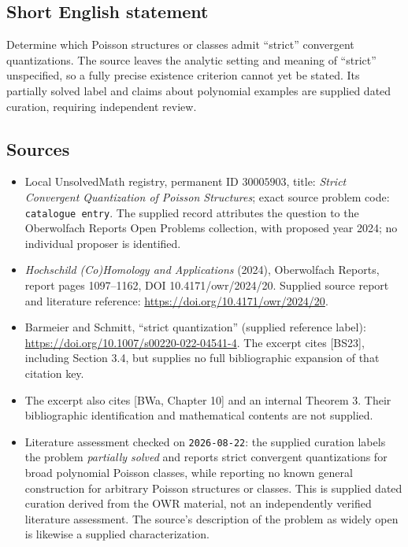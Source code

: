 \documentclass[11pt]{article}
\begin{document}
\subsection{Short English statement}
Determine which Poisson structures or classes admit ``strict'' convergent quantizations. The source leaves the analytic setting and meaning of ``strict'' unspecified, so a fully precise existence criterion cannot yet be stated. Its partially solved label and claims about polynomial examples are supplied dated curation, requiring independent review.
\subsection{Sources}
\begin{itemize}
\item Local UnsolvedMath registry, permanent ID \(30005903\), title: \emph{Strict Convergent Quantization of Poisson Structures}; exact source problem code: \texttt{catalogue entry}. The supplied record attributes the question to the Oberwolfach Reports Open Problems collection, with proposed year 2024; no individual proposer is identified.
\item \emph{Hochschild (Co)Homology and Applications} (2024), Oberwolfach Reports, report pages 1097--1162, DOI 10.4171/owr/2024/20. Supplied source report and literature reference: \url{https://doi.org/10.4171/owr/2024/20}.
\item Barmeier and Schmitt, ``strict quantization'' (supplied reference label): \url{https://doi.org/10.1007/s00220-022-04541-4}. The excerpt cites [BS23], including Section 3.4, but supplies no full bibliographic expansion of that citation key.
\item The excerpt also cites [BWa, Chapter 10] and an internal Theorem 3. Their bibliographic identification and mathematical contents are not supplied.
\item Literature assessment checked on \texttt{2026-08-22}: the supplied curation labels the problem \emph{partially solved} and reports strict convergent quantizations for broad polynomial Poisson classes, while reporting no known general construction for arbitrary Poisson structures or classes. This is supplied dated curation derived from the OWR material, not an independently verified literature assessment. The source's description of the problem as widely open is likewise a supplied characterization.
\end{itemize}
\end{document}

